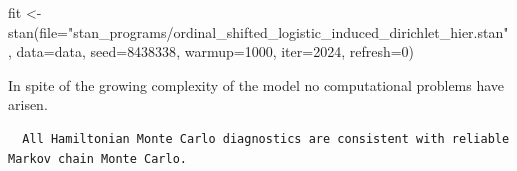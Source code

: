 \documentclass[
  letterpaper,
  DIV=11,
  numbers=noendperiod]{scrartcl}
\newenvironment{Shaded}{\begin{snugshade}}{\end{snugshade}}
\newcommand{\AttributeTok}[1]{\textcolor[rgb]{0.40,0.45,0.13}{#1}}
\newcommand{\ConstantTok}[1]{\textcolor[rgb]{0.56,0.35,0.01}{#1}}
\newcommand{\DecValTok}[1]{\textcolor[rgb]{0.68,0.00,0.00}{#1}}
\newcommand{\FunctionTok}[1]{\textcolor[rgb]{0.28,0.35,0.67}{#1}}
\newcommand{\NormalTok}[1]{\textcolor[rgb]{0.00,0.23,0.31}{#1}}
\newcommand{\OtherTok}[1]{\textcolor[rgb]{0.00,0.23,0.31}{#1}}
\newcommand{\SpecialCharTok}[1]{\textcolor[rgb]{0.37,0.37,0.37}{#1}}
\newcommand{\StringTok}[1]{\textcolor[rgb]{0.13,0.47,0.30}{#1}}
\begin{document}
\begin{Shaded}
\begin{Highlighting}[]
\NormalTok{fit }\OtherTok{\textless{}{-}} \FunctionTok{stan}\NormalTok{(}\AttributeTok{file=}\StringTok{"stan\_programs/ordinal\_shifted\_logistic\_induced\_dirichlet\_hier.stan"}\NormalTok{,}
            \AttributeTok{data=}\NormalTok{data, }\AttributeTok{seed=}\DecValTok{8438338}\NormalTok{,}
            \AttributeTok{warmup=}\DecValTok{1000}\NormalTok{, }\AttributeTok{iter=}\DecValTok{2024}\NormalTok{, }\AttributeTok{refresh=}\DecValTok{0}\NormalTok{)}
\end{Highlighting}
\end{Shaded}

In spite of the growing complexity of the model no computational
problems have arisen.

\begin{Shaded}
\end{Shaded}

\begin{verbatim}
  All Hamiltonian Monte Carlo diagnostics are consistent with reliable
Markov chain Monte Carlo.
\end{verbatim}

\begin{Shaded}
\end{Shaded}
\end{document}
